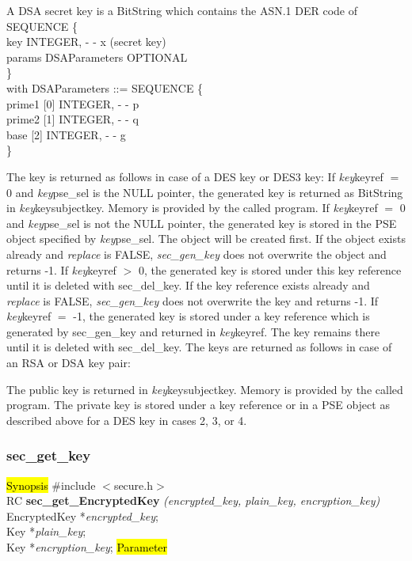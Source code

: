     A DSA secret key is a BitString
    which contains the ASN.1 DER code of
    \bvtab
    \4  SEQUENCE \{ \\
    \4  \2       key INTEGER, - - x (secret key)   \\
    \4  \2       params DSAParameters OPTIONAL  \\
    \4  \} \\
    \evtab
    with
    \bvtab
    DSAParameters ::= SEQUENCE \{ \\
    \4  \2       prime1 [0] INTEGER, - - p \\
    \4  \2       prime2 [1] INTEGER, - - q \\
    \4  \2       base [2] INTEGER, - - g \\
    \4  \} \\
    \evtab
\ei

The key is returned as follows in case of a DES key or DES3 key:
\be
\m If {\em key}\pf keyref $=$ 0 and {\em key}\pf pse\_sel is the NULL pointer, the generated key is
   returned as BitString in {\em key}\pf key\pf subjectkey. Memory is provided by the called program. 
\m If {\em key}\pf keyref $=$ 0 and {\em key}\pf pse\_sel is not the NULL pointer, the generated key
   is stored in the PSE object specified by {\em key}\pf pse\_sel.
   The object will be created first. If the object exists already and {\em replace} is FALSE, 
   {\em sec\_gen\_key} does not overwrite the object and returns -1.
\m If {\em key}\pf keyref $>$ 0, the generated key is stored under this key reference until it is
   deleted with sec\_del\_key.
   If the key reference exists already and {\em replace} is FALSE, {\em sec\_gen\_key}
   does not overwrite the key and returns -1.
\m If {\em key}\pf keyref $=$ -1, the generated key is stored under a key reference which is generated 
   by sec\_gen\_key and returned in {\em key}\pf keyref. The key remains there until it is deleted
   with sec\_del\_key.
\ee
The keys are returned as follows in case of an RSA or DSA key pair: 

The public key is returned in {\em key}\pf key\pf subjectkey. Memory is provided by the called program.
The private key is stored under a key reference or in a PSE object as described above for a DES key in 
cases 2, 3, or 4.

\subsubsection{sec\_get\_key}
\label{sec_get_enc_key}
\hl{Synopsis}
\#include $<$secure.h$>$ \\ [0.5cm]
RC {\bf sec\_get\_EncryptedKey} {\em (encrypted\_key, plain\_key, encryption\_key)} \\
EncryptedKey *{\em encrypted\_key}; \\
Key *{\em plain\_key}; \\
Key *{\em encryption\_key};
\hl{Parameter}

